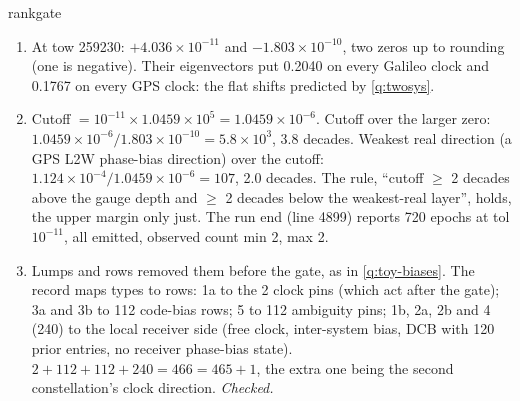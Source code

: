 \begin{answer}{rankgate}
\solution
\begin{enumerate}[leftmargin=*, itemsep=1pt]
\item At tow 259230: $+4.036\times10^{-11}$ and $-1.803\times10^{-10}$, two zeros up
      to rounding (one is negative). Their eigenvectors put 0.2040 on every Galileo
      clock and 0.1767 on every GPS clock: the flat shifts predicted by
      \cref{q:twosys}.
\item Cutoff $= 10^{-11}\times1.0459\times10^5 = 1.0459\times10^{-6}$. Cutoff over the
      larger zero: $1.0459\times10^{-6}/1.803\times10^{-10} = 5.8\times10^3$, 3.8
      decades. Weakest real direction (a GPS L2W phase-bias direction) over the
      cutoff: $1.124\times10^{-4}/1.0459\times10^{-6} = 107$, 2.0 decades. The rule,
      ``cutoff $\geq$ 2 decades above the gauge depth and $\geq$ 2 decades below the
      weakest-real layer'', holds, the upper margin only just. The run end (line
      4899) reports 720 epochs at tol $10^{-11}$, all emitted, observed count min 2,
      max 2.
\item Lumps and rows removed them before the gate, as in \cref{q:toy-biases}. The
      record maps types to rows: 1a to the 2 clock pins (which act after the gate);
      3a and 3b to 112 code-bias rows; 5 to 112 ambiguity pins; 1b, 2a, 2b and 4 (240)
      to the local receiver side (free clock, inter-system bias, DCB with 120 prior
      entries, no receiver phase-bias state). $2 + 112 + 112 + 240 = 466 = 465 + 1$, the
      extra one being the second constellation's clock direction. \emph{Checked.}
\end{enumerate}
\end{answer}

